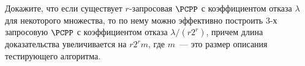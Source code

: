 Докажите, что если существует $r$-запросовая $\PCPP$ с коэффициентом отказа $\lambda$ для некоторого
множества, то по нему можно эффективно построить $3$-х запросовую $\PCPP$ с коэффициентом отказа $\lambda
/ (r 2^r)$, причем длина доказательства увеличивается на $r 2^rm$, где $m$~--- это размер описания
тестирующего алгоритма.